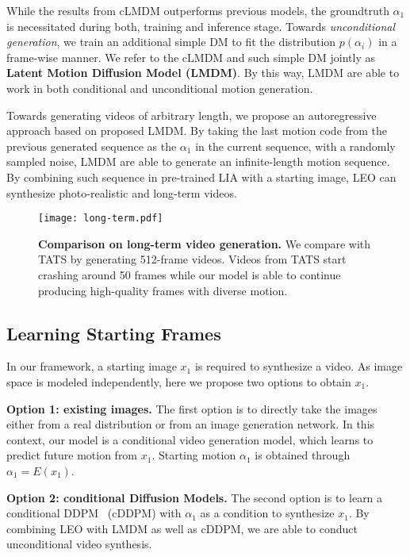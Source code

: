 While the results from cLMDM outperforms previous models, the groundtruth $\alpha_1$ is necessitated during both, training and inference stage. Towards \textit{unconditional generation}, we train an additional simple DM to fit the distribution $p(\alpha_i)$ in a frame-wise manner. We refer to the cLMDM and such simple DM jointly as \textbf{Latent Motion Diffusion Model (LMDM)}. By this way, LMDM are able to work in both conditional and unconditional motion generation. 

Towards generating videos of arbitrary length, we propose an autoregressive approach based on proposed LMDM. By taking the last motion code from the previous generated sequence as the $\alpha_1$ in the current sequence, with a randomly sampled noise, LMDM are able to generate an infinite-length motion sequence. By combining such sequence in pre-trained LIA with a starting image, LEO can synthesize photo-realistic and long-term videos.

\begin{figure*}[t!]
\centering
\texttt{[image: long-term.pdf]}  
\caption{\textbf{Comparison on long-term video generation.} We compare with TATS by generating 512-frame videos. Videos from TATS start crashing around 50 frames while our model is able to continue producing high-quality frames with diverse motion.}
\label{fig:long-term}
\end{figure*}

\subsection{Learning Starting Frames}\label{sec:img-cond}
In our framework, a starting image $x_1$ is required to synthesize a video. As image space is modeled independently, here we propose two options to obtain $x_1$.

\textbf{Option 1: existing images.} The first option is to directly take the images either from a real distribution or from an image generation network. In this context, our model is a conditional video generation model, which learns to predict future motion from $x_1$. Starting motion $\alpha_1$ is obtained through $\alpha_1 = E(x_1)$.

\textbf{Option 2: conditional Diffusion Models.} The second option is to learn a conditional DDPM~\cite{ddpm} (cDDPM) with $\alpha_1$ as a condition to synthesize $x_1$. By combining LEO with LMDM as well as cDDPM, we are able to conduct unconditional video synthesis.

